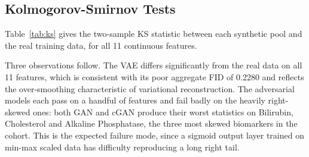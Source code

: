 \documentclass[journal,onecolumn]{IEEEtran}
\begin{document}
\subsection{Kolmogorov-Smirnov Tests}

Table~\ref{tab:ks} gives the two-sample KS statistic between each synthetic pool and the real training data, for all 11 continuous features.

\begin{table}[!t]
  \centering
  \caption{Two-Sample Kolmogorov-Smirnov Statistics Against Real Training Data. Lower is Better. An Asterisk Marks a Statistically Significant Difference at $\alpha = 0.05$}
  \label{tab:ks}
\end{table}

Three observations follow. The VAE differs significantly from the real data on all 11 features, which is consistent with its poor aggregate FID of 0.2280 and reflects the over-smoothing characteristic of variational reconstruction. The adversarial models each pass on a handful of features and fail badly on the heavily right-skewed ones: both GAN and cGAN produce their worst statistics on Bilirubin, Cholesterol and Alkaline Phosphatase, the three most skewed biomarkers in the cohort. This is the expected failure mode, since a sigmoid output layer trained on min-max scaled data has difficulty reproducing a long right tail.
\end{document}
